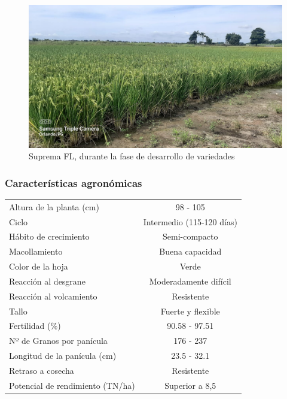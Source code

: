 \documentclass[
  letterpaper,
  DIV=11,
  numbers=noendperiod]{scrartcl}
\begin{document}
\begin{figure}[H]

{\centering \includegraphics{AP009-8.jpeg}

}

\caption{Suprema FL, durante la fase de desarrollo de variedades}

\end{figure}%

\subsubsection{\texorpdfstring{\textbf{Características
agronómicas}}{Características agronómicas}}\label{caracteruxedsticas-agronuxf3micas}

\begin{longtable}[]{@{}lc@{}}
\toprule\noalign{}
\endhead
\bottomrule\noalign{}
\endlastfoot
Altura de la planta (cm) & 98 - 105 \\
Ciclo & Intermedio (115-120 días) \\
Hábito de crecimiento & Semi-compacto \\
Macollamiento & Buena capacidad \\
Color de la hoja & Verde \\
Reacción al desgrane & Moderadamente difícil \\
Reacción al volcamiento & Resistente \\
Tallo & Fuerte y flexible \\
Fertilidad (\%) & 90.58 - 97.51 \\
Nº de Granos por panícula & 176 - 237 \\
Longitud de la panícula (cm) & 23.5 - 32.1 \\
Retraso a cosecha & Resistente \\
Potencial de rendimiento (TN/ha) & Superior a 8,5 \\
\end{longtable}
\end{document}
